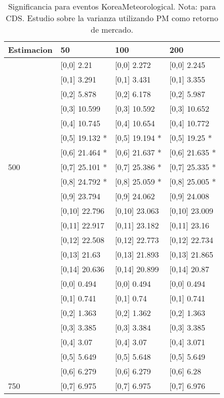 \begin{table}

\caption{Significancia para eventos KoreaMeteorological. Nota: para CDS. Estudio sobre la varianza utilizando PM como retorno de mercado.}
\centering
\begin{tabular}[t]{llll}
\toprule
Estimacion & 50 & 100 & 200\\
\midrule
 & {}[0,0] 2.21 & {}[0,0] 2.272 & {}[0,0] 2.245\\
 & {}[0,1] 3.291 & {}[0,1] 3.431 & {}[0,1] 3.355\\
 & {}[0,2] 5.878 & {}[0,2] 6.178 & {}[0,2] 5.987\\
 & {}[0,3] 10.599 & {}[0,3] 10.592 & {}[0,3] 10.652\\
 & {}[0,4] 10.745 & {}[0,4] 10.654 & {}[0,4] 10.772\\
\addlinespace
 & {}[0,5] 19.132 * & {}[0,5] 19.194 * & {}[0,5] 19.25 *\\
 & {}[0,6] 21.464 * & {}[0,6] 21.637 * & {}[0,6] 21.635 *\\
500 & {}[0,7] 25.101 * & {}[0,7] 25.386 * & {}[0,7] 25.335 *\\
 & {}[0,8] 24.792 * & {}[0,8] 25.059 * & {}[0,8] 25.005 *\\
 & {}[0,9] 23.794 & {}[0,9] 24.062 & {}[0,9] 24.008\\
\addlinespace
 & {}[0,10] 22.796 & {}[0,10] 23.063 & {}[0,10] 23.009\\
 & {}[0,11] 22.917 & {}[0,11] 23.182 & {}[0,11] 23.16\\
 & {}[0,12] 22.508 & {}[0,12] 22.773 & {}[0,12] 22.734\\
 & {}[0,13] 21.63 & {}[0,13] 21.893 & {}[0,13] 21.865\\
 & {}[0,14] 20.636 & {}[0,14] 20.899 & {}[0,14] 20.87\\
\addlinespace
 & {}[0,0] 0.494 & {}[0,0] 0.494 & {}[0,0] 0.494\\
 & {}[0,1] 0.741 & {}[0,1] 0.74 & {}[0,1] 0.741\\
 & {}[0,2] 1.363 & {}[0,2] 1.362 & {}[0,2] 1.363\\
 & {}[0,3] 3.385 & {}[0,3] 3.384 & {}[0,3] 3.385\\
 & {}[0,4] 3.07 & {}[0,4] 3.07 & {}[0,4] 3.071\\
\addlinespace
 & {}[0,5] 5.649 & {}[0,5] 5.648 & {}[0,5] 5.649\\
 & {}[0,6] 6.279 & {}[0,6] 6.279 & {}[0,6] 6.28\\
750 & {}[0,7] 6.975 & {}[0,7] 6.975 & {}[0,7] 6.976\\

\end{tabular}
\end{table}
